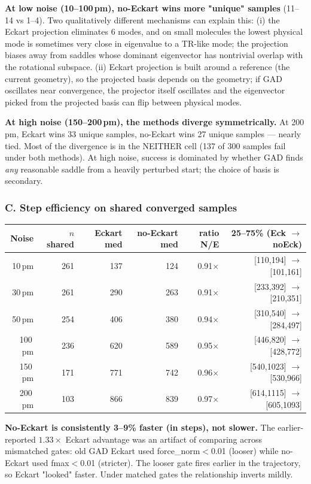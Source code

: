 \documentclass[11pt]{article}
\begin{document}
\textbf{At low noise (10--100\,pm), no-Eckart wins more "unique" samples}
(11--14 vs 1--4). Two qualitatively different mechanisms can explain this:
(i) the Eckart projection eliminates 6 modes, and on small molecules
the lowest physical mode is sometimes very close in eigenvalue to a
TR-like mode; the projection biases away from saddles whose dominant
eigenvector has nontrivial overlap with the rotational subspace.
(ii) Eckart projection is built around a reference (the current
geometry), so the projected basis depends on the geometry; if GAD
oscillates near convergence, the projector itself oscillates and the
eigenvector picked from the projected basis can flip between physical
modes.

\textbf{At high noise (150--200\,pm), the methods diverge symmetrically.}
At 200\,pm, Eckart wins 33 unique samples, no-Eckart wins 27 unique
samples --- nearly tied. Most of the divergence is in the NEITHER cell
(137 of 300 samples fail under both methods). At high noise, success
is dominated by whether GAD finds \emph{any} reasonable saddle from a
heavily perturbed start; the choice of basis is secondary.

\subsubsection*{C. Step efficiency on shared converged samples}

\begin{center}
\begin{tabular}{rrrrrr}
\toprule
Noise & $n$ shared & Eckart med & no-Eckart med & ratio N/E & 25--75\% (Eck $\to$ noEck) \\
\midrule
10\,pm  & 261 & 137 & 124 & 0.91$\times$ & [110,194] $\to$ [101,161] \\
30\,pm  & 261 & 290 & 263 & 0.91$\times$ & [233,392] $\to$ [210,351] \\
50\,pm  & 254 & 406 & 380 & 0.94$\times$ & [310,540] $\to$ [284,497] \\
100\,pm & 236 & 620 & 589 & 0.95$\times$ & [446,820] $\to$ [428,772] \\
150\,pm & 171 & 771 & 742 & 0.96$\times$ & [540,1023] $\to$ [530,966] \\
200\,pm & 103 & 866 & 839 & 0.97$\times$ & [614,1115] $\to$ [605,1093] \\
\bottomrule
\end{tabular}
\end{center}

\textbf{No-Eckart is consistently 3--9\% faster (in steps), not slower.}
The earlier-reported $1.33\times$ Eckart advantage was an artifact of
comparing across mismatched gates: old GAD Eckart used force\_norm$<$0.01
(looser) while no-Eckart used fmax$<$0.01 (stricter). The looser gate
fires earlier in the trajectory, so Eckart "looked" faster. Under
matched gates the relationship inverts mildly.
\end{document}
